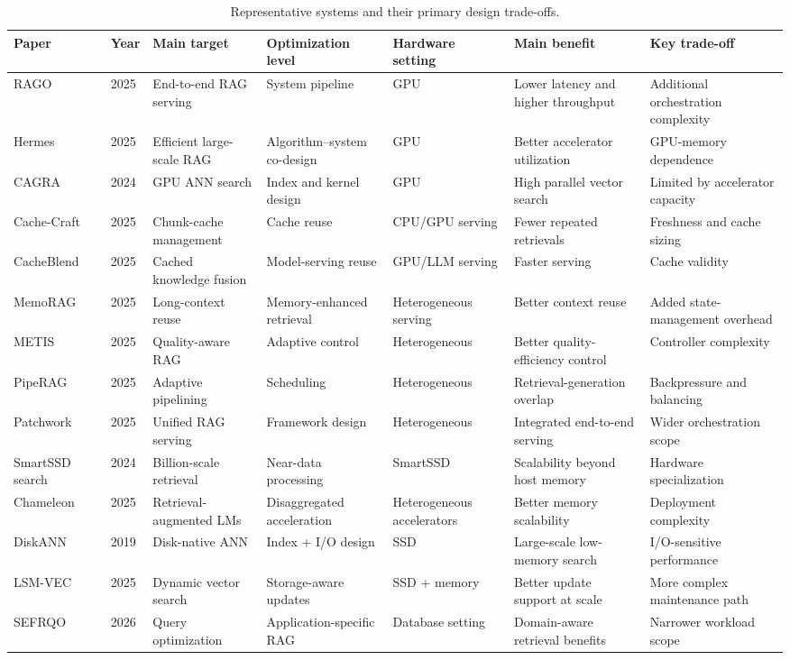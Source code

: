 \documentclass[acmsmall,screen]{acmart}
\begin{document}
\begin{table}[t]
\caption{Representative systems and their primary design trade-offs.}
\label{tab:comparison}
\footnotesize
\begin{tabularx}{\textwidth}{@{}p{1.6cm}p{0.8cm}p{2.1cm}p{2.0cm}p{1.8cm}p{2.2cm}X@{}}
\toprule
Paper & Year & Main target & Optimization level & Hardware setting & Main benefit & Key trade-off \\
\midrule
RAGO~\cite{rago2025} & 2025 & End-to-end RAG serving & System pipeline & GPU & Lower latency and higher throughput & Additional orchestration complexity \\
Hermes~\cite{hermes2025} & 2025 & Efficient large-scale RAG & Algorithm--system co-design & GPU & Better accelerator utilization & GPU-memory dependence \\
CAGRA~\cite{cagra2024} & 2024 & GPU ANN search & Index and kernel design & GPU & High parallel vector search & Limited by accelerator capacity \\
Cache-Craft~\cite{cachecraft2025} & 2025 & Chunk-cache management & Cache reuse & CPU/GPU serving & Fewer repeated retrievals & Freshness and cache sizing \\
CacheBlend~\cite{cacheblend2025} & 2025 & Cached knowledge fusion & Model-serving reuse & GPU/LLM serving & Faster serving & Cache validity \\
MemoRAG~\cite{memorag2025} & 2025 & Long-context reuse & Memory-enhanced retrieval & Heterogeneous serving & Better context reuse & Added state-management overhead \\
METIS~\cite{metis2025} & 2025 & Quality-aware RAG & Adaptive control & Heterogeneous & Better quality-efficiency control & Controller complexity \\
PipeRAG~\cite{piperag2025} & 2025 & Adaptive pipelining & Scheduling & Heterogeneous & Retrieval-generation overlap & Backpressure and balancing \\
Patchwork~\cite{patchwork2025} & 2025 & Unified RAG serving & Framework design & Heterogeneous & Integrated end-to-end serving & Wider orchestration scope \\
SmartSSD search~\cite{smartssd2024} & 2024 & Billion-scale retrieval & Near-data processing & SmartSSD & Scalability beyond host memory & Hardware specialization \\
Chameleon~\cite{chameleon2025} & 2025 & Retrieval-augmented LMs & Disaggregated acceleration & Heterogeneous accelerators & Better memory scalability & Deployment complexity \\
DiskANN~\cite{diskann2019} & 2019 & Disk-native ANN & Index + I/O design & SSD & Large-scale low-memory search & I/O-sensitive performance \\
LSM-VEC~\cite{lsmvec2025} & 2025 & Dynamic vector search & Storage-aware updates & SSD + memory & Better update support at scale & More complex maintenance path \\
SEFRQO~\cite{sefrqo2026} & 2026 & Query optimization & Application-specific RAG & Database setting & Domain-aware retrieval benefits & Narrower workload scope \\
\bottomrule
\end{tabularx}
\end{table}
\end{document}
